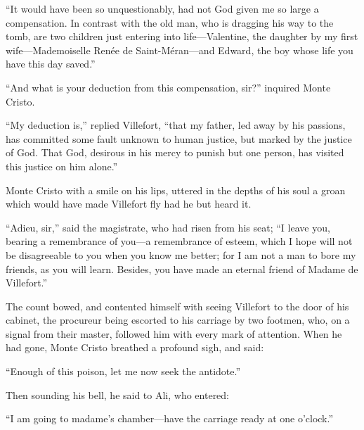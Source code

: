 “It would have been so unquestionably, had not God given me so large a
compensation. In contrast with the old man, who is dragging his way to
the tomb, are two children just entering into life—Valentine, the
daughter by my first wife—Mademoiselle Renée de Saint-Méran—and Edward,
the boy whose life you have this day saved.”

“And what is your deduction from this compensation, sir?” inquired
Monte Cristo.

“My deduction is,” replied Villefort, “that my father, led away by his
passions, has committed some fault unknown to human justice, but marked
by the justice of God. That God, desirous in his mercy to punish but
one person, has visited this justice on him alone.”

Monte Cristo with a smile on his lips, uttered in the depths of his
soul a groan which would have made Villefort fly had he but heard it.

“Adieu, sir,” said the magistrate, who had risen from his seat; “I
leave you, bearing a remembrance of you—a remembrance of esteem, which
I hope will not be disagreeable to you when you know me better; for I
am not a man to bore my friends, as you will learn. Besides, you have
made an eternal friend of Madame de Villefort.”

The count bowed, and contented himself with seeing Villefort to the
door of his cabinet, the procureur being escorted to his carriage by
two footmen, who, on a signal from their master, followed him with
every mark of attention. When he had gone, Monte Cristo breathed a
profound sigh, and said:

“Enough of this poison, let me now seek the antidote.”

Then sounding his bell, he said to Ali, who entered:

“I am going to madame’s chamber—have the carriage ready at one
o’clock.”
